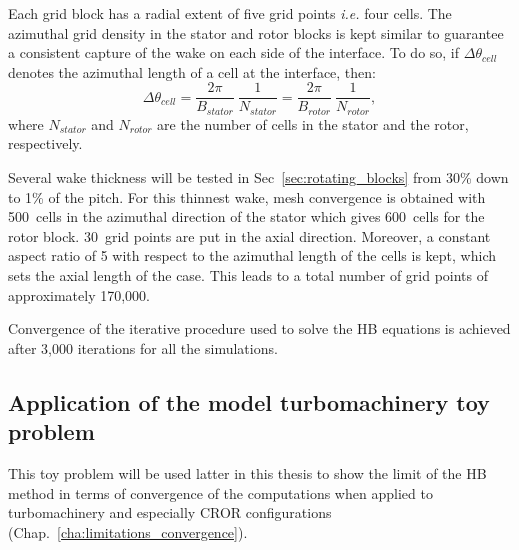 Each grid block has a radial extent of five grid points \emph{i.e.} four cells. 
The azimuthal grid density in the stator and rotor blocks is kept similar
to guarantee a consistent capture of the wake on each side of the interface.
To do so, if $\Delta \theta_{cell}$ denotes the azimuthal length of a cell
at the interface, then:
\begin{equation}
   \Delta \theta_{cell} = \frac{2\pi}{B_{stator}}~\frac{1}{N_{stator}}
   = \frac{2\pi}{B_{rotor}}~\frac{1}{N_{rotor}},
   \label{eq:az_spatial_discretization_1}
\end{equation}
where $N_{stator}$ and $N_{rotor}$ are the number of cells
in the stator and the rotor, respectively. 

Several wake thickness will be tested in Sec~\ref{sec:rotating_blocks}
from 30\% down to 1\% of the pitch. For this thinnest wake, 
mesh convergence
is obtained with 500~cells in the azimuthal direction of
the stator which gives
600~cells for the rotor block.
30~grid points are put in the axial direction. Moreover, a constant
aspect ratio of 5 with respect to the azimuthal length of the cells is
kept, which sets the axial length of the case.
This leads to a total number of grid points of approximately 
170,000. 

Convergence of the iterative procedure used to solve the HB equations is achieved 
after 3,000 iterations for 
all the simulations. 

\subsection{Application of the model turbomachinery toy problem}

This toy problem will be used latter in this thesis to
show the limit of the HB method in terms 
of convergence of the computations when applied to turbomachinery and 
especially CROR configurations (Chap.~\ref{cha:limitations_convergence}).